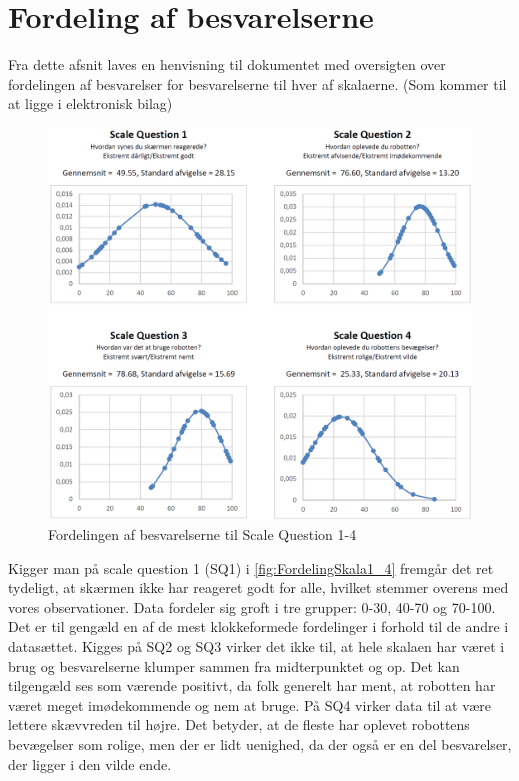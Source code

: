 \section{Fordeling af besvarelserne}
\label{TestAfSkalaFordelingAfBesvarelserne}
%
Fra dette afsnit laves en henvisning til dokumentet med oversigten over fordelingen af besvarelser for besvarelserne til hver af skalaerne. (Som kommer til at ligge i elektronisk bilag)
%
\begin{figure}[H]
\centering
\includegraphics[width =\textwidth]{Figure/DatabehandlingSkalaer/FordelingSkala1_4} 
\caption{Fordelingen af besvarelserne til Scale Question 1-4}
\label{fig:FordelingSkala1_4}
\end{figure}
\noindent
%
Kigger man på scale question 1 (SQ1) i \autoref{fig:FordelingSkala1_4} fremgår det ret tydeligt, at skærmen ikke har reageret godt for alle, hvilket stemmer overens med vores observationer. Data fordeler sig groft i tre grupper: 0-30, 40-70 og 70-100. Det er til gengæld en af de mest klokkeformede fordelinger i forhold til de andre i datasættet. Kigges på SQ2 og SQ3 virker det ikke til, at hele skalaen har været i brug og besvarelserne klumper sammen fra midterpunktet og op. Det kan tilgengæld ses som værende positivt, da folk generelt har ment, at robotten har været meget imødekommende og nem at bruge. På SQ4 virker data til at være lettere skævvreden til højre. Det betyder, at de fleste har oplevet robottens bevægelser som rolige, men der er lidt uenighed, da der også er en del besvarelser, der ligger i den vilde ende.

